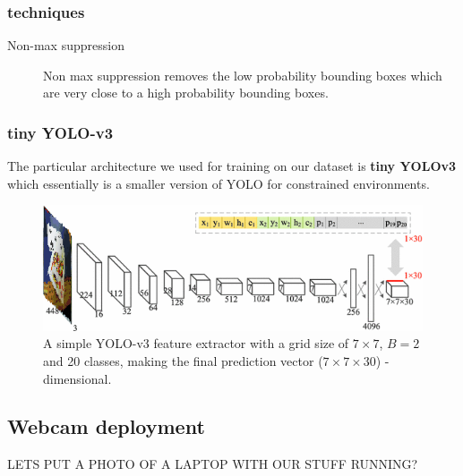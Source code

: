 \documentclass[a4paper]{article}
\begin{document}
\subsubsection*{techniques}
\begin{description}
\item[Non-max suppression] Non max suppression removes the low probability bounding boxes which are very close to a high probability bounding boxes.
\end{description}

\subsubsection*{tiny YOLO-v3}

The particular architecture we used for training on our dataset is \textbf{tiny YOLOv3} which essentially is a smaller version of YOLO for constrained environments.
\begin{figure}


\includegraphics[width=1\linewidth]{tinyyolo}
\caption{A simple YOLO-v3 feature extractor with a grid size of $7\times 7$, $B=2$ and 20 classes, making the final prediction vector ($7 \times 7 \times 30$) - dimensional. }
\end{figure}

\subsection{Webcam deployment}
LETS PUT A PHOTO OF A LAPTOP WITH OUR STUFF RUNNING?
\end{document}
